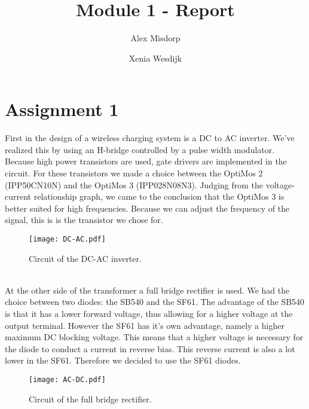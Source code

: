 \documentclass[final]{scrreprt} %
\title{Module 1 - Report}
\author{Alex {Misdorp} \and Xenia {Wesdijk}}
\begin{document}
\chapter{Assignment 1}
First in the design of a wireless charging system is a DC to AC inverter. We've realized this by using an H-bridge controlled by a pulse width modulator. Because high power transistors are used, gate drivers are implemented in the circuit. For these transistors we made a choice between the OptiMos 2 (IPP50CN10N)  and the OptiMos 3 (IPP028N08N3). Judging from the voltage-current relationship graph, we came to the conclusion that the OptiMos 3 is better suited for high frequencies. Because we can adjust the frequency of the signal, this is is the transistor we chose for.
\begin{figure}[h!]
\centering
\texttt{[image: DC-AC.pdf]}
\caption{Circuit of the DC-AC inverter.}
\label{fig:DC-AC}
\end{figure}\\
At the other side of the transformer a full bridge rectifier is used. We had the choice between two diodes: the SB540 and the SF61. The advantage of the SB540 is that it has a lower forward voltage, thus allowing for a higher voltage at the output terminal. However the SF61 has it's own advantage, namely a higher maximum DC blocking voltage. This means that a higher voltage is necessary for the diode to conduct a current in reverse bias. This reverse current is also a lot lower in the SF61. Therefore we decided to use the SF61 diodes.
\begin{figure}[h!]
\centering
\texttt{[image: AC-DC.pdf]}
\caption{Circuit of the full bridge rectifier.}
\label{fig:AC-DC}
\end{figure}
\end{document}
